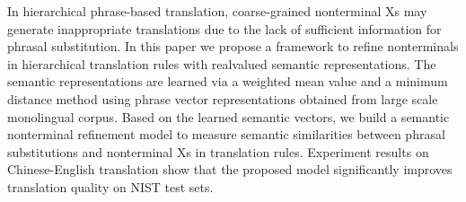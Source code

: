 In hierarchical phrase-based translation, coarse-grained nonterminal Xs may generate inappropriate translations due to the lack of sufficient information for phrasal substitution. In this paper we propose a framework to refine nonterminals in hierarchical translation rules with realvalued semantic representations. The semantic representations are learned via a weighted mean value and a minimum distance method using phrase vector representations obtained from large scale monolingual corpus. Based on the learned semantic vectors, we build a semantic nonterminal refinement model to measure semantic similarities between phrasal substitutions and nonterminal Xs in translation rules. Experiment results on Chinese-English translation show that the proposed model significantly improves translation quality on NIST test sets.
